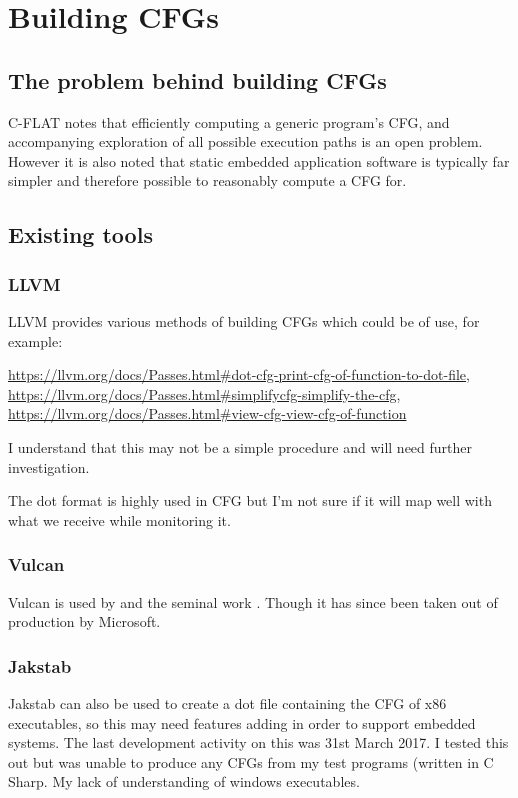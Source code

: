 \section{Building CFGs}

\subsection{The problem behind building CFGs}

C-FLAT \cite{Abera2016} notes that efficiently computing a generic program's CFG, and accompanying exploration of all possible execution paths is an open problem. However it is also noted that static embedded application software is typically far simpler and therefore possible to reasonably compute a CFG for. 

\subsection{Existing tools}

\subsubsection{LLVM}

LLVM provides various methods of building CFGs which could be of use, for example:

\url{https://llvm.org/docs/Passes.html#dot-cfg-print-cfg-of-function-to-dot-file},
\url{https://llvm.org/docs/Passes.html#simplifycfg-simplify-the-cfg},
\url{https://llvm.org/docs/Passes.html#view-cfg-view-cfg-of-function}

I understand that this may not be a simple procedure and will need further investigation.

The dot format is highly used in CFG but I'm not sure if it will map well with what we receive while monitoring it.

\subsubsection{Vulcan}

Vulcan \cite{Edwards2001} is used by \cite{Davi2012} and the seminal work \cite{Abadi2005}. Though it has since been taken out of production by Microsoft.

\subsubsection{Jakstab}

Jakstab \cite{Kinder2008} can also be used to create a dot file containing the CFG of x86 executables, so this may need features adding in order to support embedded systems. The last development activity on this was 31st March 2017. I tested this out but was unable to produce any CFGs from my test programs (written in C Sharp. My lack of understanding of windows executables. 

